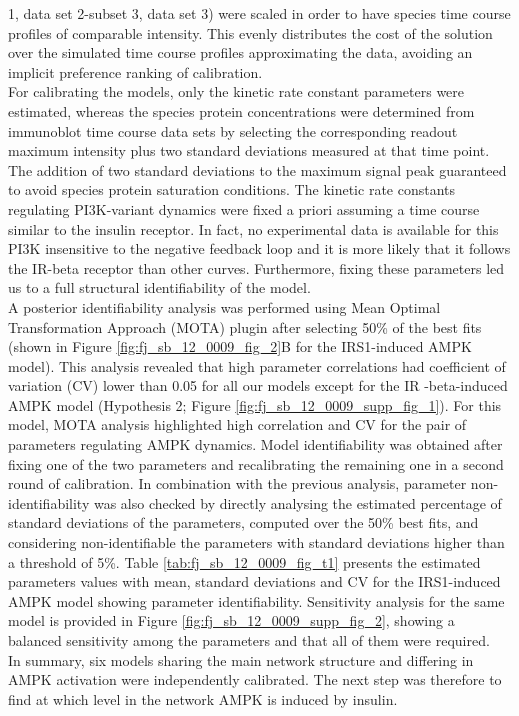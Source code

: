 1, data set 2-subset 3, data set 3) were scaled in order to have species time course profiles of comparable intensity. This evenly distributes the cost of the solution over the simulated time course profiles approximating the data, avoiding an implicit preference ranking of calibration. \\
For calibrating the models, only the kinetic rate constant parameters were estimated, whereas the species protein concentrations were determined from immunoblot time course data sets by selecting the corresponding readout maximum intensity plus two standard deviations measured at that time point. The addition of two standard deviations to the maximum signal peak guaranteed to avoid species protein saturation conditions. The kinetic rate constants regulating PI3K-variant dynamics were fixed a priori assuming a time course similar to the insulin receptor. In fact, no experimental data is available for this PI3K insensitive to the negative feedback loop and it is more likely that it follows the IR-beta receptor than other curves. Furthermore, fixing these parameters led us to a full structural identifiability of the model.\\
A posterior identifiability analysis was performed using Mean Optimal Transformation Approach (MOTA) plugin \citep{Maiwald2008, Hengl2007} after selecting 50\% of the best fits (shown in Figure \ref{fig:fj_sb_12_0009_fig_2}B for the IRS1-induced AMPK model). This analysis revealed that high parameter correlations had coefficient of variation (CV) lower than 0.05 for all our models except for the IR -beta-induced AMPK model (Hypothesis 2; Figure \ref{fig:fj_sb_12_0009_supp_fig_1}). For this model, MOTA analysis highlighted high correlation and CV for the pair of parameters regulating AMPK dynamics. Model identifiability was obtained after fixing one of the two parameters and recalibrating the remaining one in a second round of calibration. In combination with the previous analysis, parameter non-identifiability was also checked by directly analysing the estimated percentage of standard deviations of the parameters, computed over the 50\% best fits, and considering non-identifiable the parameters with 
standard deviations higher than a threshold of 5\%. Table \ref{tab:fj_sb_12_0009_fig_t1} presents the estimated parameters values with mean, standard deviations and CV for the IRS1-induced AMPK model showing parameter identifiability. Sensitivity analysis for the same model is provided in Figure \ref{fig:fj_sb_12_0009_supp_fig_2}, showing a balanced sensitivity among the parameters and that all of them were required.\\
In summary, six models sharing the main network structure and differing in AMPK activation were independently calibrated. The next step was therefore to find at which level in the network AMPK is induced by insulin. 

